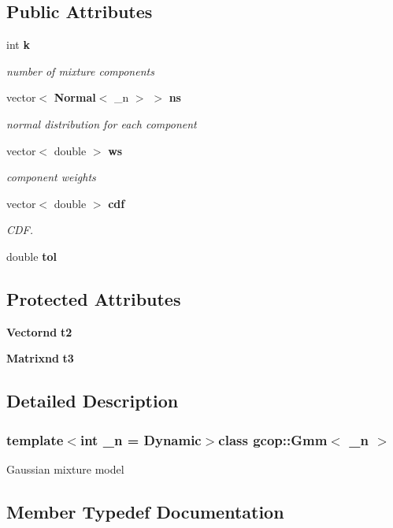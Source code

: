 \subsection*{\-Public \-Attributes}
\begin{DoxyCompactItemize}
\item 
int {\bf k}
\begin{DoxyCompactList}\small\item\em number of mixture components \end{DoxyCompactList}\item 
vector$<$ {\bf \-Normal}$<$ \-\_\-n $>$ $>$ {\bf ns}
\begin{DoxyCompactList}\small\item\em normal distribution for each component \end{DoxyCompactList}\item 
vector$<$ double $>$ {\bf ws}
\begin{DoxyCompactList}\small\item\em component weights \end{DoxyCompactList}\item 
vector$<$ double $>$ {\bf cdf}
\begin{DoxyCompactList}\small\item\em \-C\-D\-F. \end{DoxyCompactList}\item 
double {\bf tol}
\end{DoxyCompactItemize}
\subsection*{\-Protected \-Attributes}
\begin{DoxyCompactItemize}
\item 
{\bf \-Vectornd} {\bf t2}
\item 
{\bf \-Matrixnd} {\bf t3}
\end{DoxyCompactItemize}


\subsection{\-Detailed \-Description}
\subsubsection*{template$<$int \-\_\-n = \-Dynamic$>$class gcop\-::\-Gmm$<$ \-\_\-n $>$}

\-Gaussian mixture model 

\subsection{\-Member \-Typedef \-Documentation}
